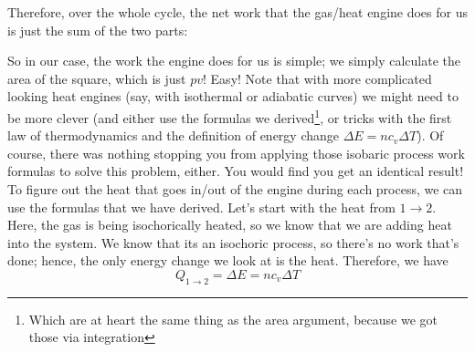 Therefore, over the whole cycle, the net work that the gas/heat engine does for us is just the sum of the two parts:

\begin{center}
\end{center}
So in our case, the work the engine does for us is simple; we simply calculate the area of the square, which is just $pv$! Easy! Note that with more complicated looking heat engines (say, with isothermal or adiabatic curves) we might need to be more clever (and either use the formulas we derived\footnote{Which are at heart the same thing as the area argument, because we got those via integration}, or tricks with the first law of thermodynamics and the definition of energy change $\Delta E = nc_v\Delta T$). Of course, there was nothing stopping you from applying those isobaric process work formulas to solve this problem, either. You would find you get an identical result! \\
To figure out the heat that goes in/out of the engine during each process, we can use the formulas that we have derived. Let's start with the heat from $1 \rightarrow 2$. Here, the gas is being isochorically heated, so we know that we are adding heat into the system. We know that its an isochoric process, so there's no work that's done; hence, the only energy change we look at is the heat. Therefore, we have \[ Q_{1\rightarrow 2} = \Delta E  = nc_v \Delta T \]
